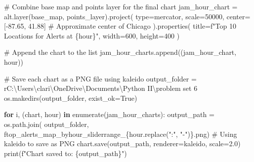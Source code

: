 \documentclass[
  letterpaper,
  DIV=11,
  numbers=noendperiod]{scrartcl}
\newenvironment{Shaded}{\begin{snugshade}}{\end{snugshade}}
\newcommand{\BuiltInTok}[1]{\textcolor[rgb]{0.00,0.23,0.31}{#1}}
\newcommand{\CommentTok}[1]{\textcolor[rgb]{0.37,0.37,0.37}{#1}}
\newcommand{\ControlFlowTok}[1]{\textcolor[rgb]{0.00,0.23,0.31}{\textbf{#1}}}
\newcommand{\DecValTok}[1]{\textcolor[rgb]{0.68,0.00,0.00}{#1}}
\newcommand{\FloatTok}[1]{\textcolor[rgb]{0.68,0.00,0.00}{#1}}
\newcommand{\KeywordTok}[1]{\textcolor[rgb]{0.00,0.23,0.31}{\textbf{#1}}}
\newcommand{\NormalTok}[1]{\textcolor[rgb]{0.00,0.23,0.31}{#1}}
\newcommand{\OperatorTok}[1]{\textcolor[rgb]{0.37,0.37,0.37}{#1}}
\newcommand{\SpecialCharTok}[1]{\textcolor[rgb]{0.37,0.37,0.37}{#1}}
\newcommand{\SpecialStringTok}[1]{\textcolor[rgb]{0.13,0.47,0.30}{#1}}
\newcommand{\StringTok}[1]{\textcolor[rgb]{0.13,0.47,0.30}{#1}}
\newcommand{\VariableTok}[1]{\textcolor[rgb]{0.07,0.07,0.07}{#1}}
\newcommand{\VerbatimStringTok}[1]{\textcolor[rgb]{0.13,0.47,0.30}{#1}}
\begin{document}
\begin{Shaded}
\begin{Highlighting}[]
    \CommentTok{\# Combine base map and points layer for the final chart}
\NormalTok{    jam\_hour\_chart }\OperatorTok{=}\NormalTok{ alt.layer(base\_map, points\_layer).project(}
        \BuiltInTok{type}\OperatorTok{=}\StringTok{\textquotesingle{}mercator\textquotesingle{}}\NormalTok{,}
\NormalTok{        scale}\OperatorTok{=}\DecValTok{50000}\NormalTok{,}
\NormalTok{        center}\OperatorTok{=}\NormalTok{[}\OperatorTok{{-}}\FloatTok{87.65}\NormalTok{, }\FloatTok{41.88}\NormalTok{]  }\CommentTok{\# Approximate center of Chicago}
\NormalTok{    ).properties(}
\NormalTok{        title}\OperatorTok{=}\SpecialStringTok{f"Top 10 Locations for Alerts at }\SpecialCharTok{\{}\NormalTok{hour}\SpecialCharTok{\}}\SpecialStringTok{"}\NormalTok{,}
\NormalTok{        width}\OperatorTok{=}\DecValTok{600}\NormalTok{,}
\NormalTok{        height}\OperatorTok{=}\DecValTok{400}
\NormalTok{    )}

    \CommentTok{\# Append the chart to the list}
\NormalTok{    jam\_hour\_charts.append((jam\_hour\_chart, hour))}

\CommentTok{\# Save each chart as a PNG file using kaleido}
\NormalTok{output\_folder }\OperatorTok{=} \VerbatimStringTok{r\textquotesingle{}C:\textbackslash{}Users\textbackslash{}clari\textbackslash{}OneDrive\textbackslash{}Documents\textbackslash{}Python II\textbackslash{}problem set 6\textquotesingle{}}
\NormalTok{os.makedirs(output\_folder, exist\_ok}\OperatorTok{=}\VariableTok{True}\NormalTok{)}

\ControlFlowTok{for}\NormalTok{ i, (chart, hour) }\KeywordTok{in} \BuiltInTok{enumerate}\NormalTok{(jam\_hour\_charts):}
\NormalTok{    output\_path }\OperatorTok{=}\NormalTok{ os.path.join(}
\NormalTok{        output\_folder, }\SpecialStringTok{f\textquotesingle{}top\_alerts\_map\_byhour\_sliderrange\_}\SpecialCharTok{\{}\NormalTok{hour}\SpecialCharTok{.}\NormalTok{replace(}\StringTok{":"}\NormalTok{, }\StringTok{"{-}"}\NormalTok{)}\SpecialCharTok{\}}\SpecialStringTok{.png\textquotesingle{}}\NormalTok{)}
    \CommentTok{\# Using kaleido to save as PNG}
\NormalTok{    chart.save(output\_path, renderer}\OperatorTok{=}\StringTok{\textquotesingle{}kaleido\textquotesingle{}}\NormalTok{, scale}\OperatorTok{=}\FloatTok{2.0}\NormalTok{)}
    \BuiltInTok{print}\NormalTok{(}\SpecialStringTok{f"Chart saved to: }\SpecialCharTok{\{}\NormalTok{output\_path}\SpecialCharTok{\}}\SpecialStringTok{"}\NormalTok{)}
\end{Highlighting}
\end{Shaded}
\end{document}
